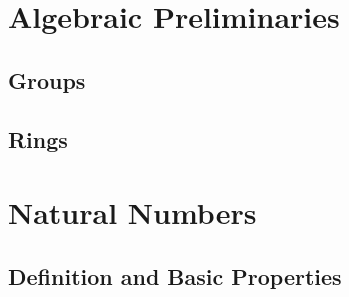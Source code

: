 \nocite{*}


\section{Algebraic Preliminaries}

\subsection{Groups}






\subsection{Rings}







\section{Natural Numbers}

\subsection{Definition and Basic Properties}











